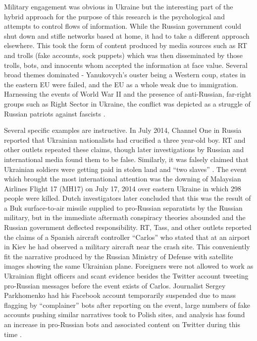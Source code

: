 Military engagement was obvious in Ukraine but the interesting part of the hybrid approach for the purpose of this research is the psychological and attempts to control flows of information.
While the Russian government could shut down and stifle networks based at home, it had to take a different approach elsewhere.
This took the form of content produced by media sources such as RT and trolls (fake accounts, sock puppets) which was then disseminated by those trolls, bots, and innocents whom accepted the information at face value.
Several broad themes dominated - Yanukovych's ouster being a Western coup, states in the eastern EU were failed, and the EU as a whole weak due to immigration.
Harnessing the events of World War II and the presence of anti-Russian, far-right groups such as Right Sector in Ukraine, the conflict was depicted as a struggle of Russian patriots against fascists \cite[p. 41]{woolley2018}.

Several specific examples are instructive.
In July 2014, Channel One in Russia reported that Ukrainian nationalists had crucified a three year-old boy.
RT and other outlets repeated these claims, though later investigations by Russian and international media found them to be false.
Similarly, it was falsely claimed that Ukrainian soldiers were getting paid in stolen land and ``two slaves'' \cite[p. 41]{woolley2018}.
The event which brought the most international attention was the downing of Malaysian Airlines Flight 17 (MH17) on July 17, 2014 over eastern Ukraine in which 298 people were killed.
Dutch investigators later concluded that this was the result of a Buk surface-to-air missile supplied to pro-Russian separatists by the Russian military, but in the immediate aftermath conspiracy theories abounded and the Russian government deflected responsibility.
RT, Tass, and other outlets reported the claims of a Spanish aircraft controller ``Carlos'' who stated that at an airport in Kiev he had observed a military aircraft near the crash site.
This conveniently fit the narrative produced by the Russian Ministry of Defense with satellite images showing the same Ukrainian plane.
Foreigners were not allowed to work as Ukrainian flight officers and scant evidence besides the Twitter account tweeting pro-Russian messages before the event exists of Carlos.
Journalist Sergey Parkhomenko had his Facebook account temporarily suspended due to mass flagging by ``complainer'' bots after reporting on the event, large numbers of fake accounts pushing similar narratives took to Polish sites, and analysis has found an increase in pro-Russian bots and associated content on Twitter during this time \cite[pp. 55-56]{woolley2018}.

